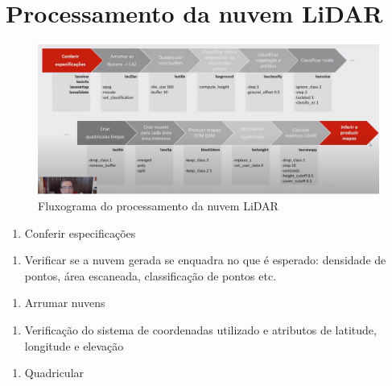 \documentclass[
]{article}
\providecommand{\tightlist}{%
  \setlength{\itemsep}{0pt}\setlength{\parskip}{0pt}}
\begin{document}
\newpage

\section{Processamento da nuvem
LiDAR}\label{processamento-da-nuvem-lidar}

\begin{figure}

{\centering \includegraphics[width=0.8\linewidth]{IMAGES/fluxograma-funcoes} 

}

\caption{Fluxograma do processamento da nuvem LiDAR}\label{fig:unnamed-chunk-7}
\end{figure}

\begin{enumerate}
\def\labelenumi{\arabic{enumi}.}
\tightlist
\item
  Conferir especificações
\end{enumerate}

\begin{enumerate}
\def\labelenumi{\roman{enumi}.}
\tightlist
\item
  Verificar se a nuvem gerada se enquadra no que é esperado: densidade
  de pontos, área escaneada, classificação de pontos etc.
\end{enumerate}

\begin{enumerate}
\def\labelenumi{\arabic{enumi}.}
\setcounter{enumi}{1}
\tightlist
\item
  Arrumar nuvens
\end{enumerate}

\begin{enumerate}
\def\labelenumi{\roman{enumi}.}
\tightlist
\item
  Verificação do sistema de coordenadas utilizado e atributos de
  latitude, longitude e elevação
\end{enumerate}

\begin{enumerate}
\def\labelenumi{\arabic{enumi}.}
\setcounter{enumi}{2}
\tightlist
\item
  Quadricular
\end{enumerate}
\end{document}
